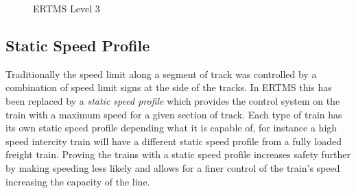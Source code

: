 \begin{center}
\begin{figure}[h!]



 \caption{ERTMS Level 3}
\label{fig:ERTMSLevel3}
\end{figure}
\end{center}


\subsection*{Static Speed Profile}
Traditionally the speed limit along a segment of track was controlled by a combination of speed limit signs at the side of the tracks. In ERTMS this has been replaced by a \emph{static speed profile} which provides the control system on the train with a maximum speed for a given section of track. Each type of train has its own static speed profile depending what it is capable of, for instance a high speed intercity train will have a different static speed profile from a fully loaded freight train. Proving the trains with a static speed profile increases safety further by making speeding less likely and allows for a finer control of the train's speed increasing the capacity of the line.

